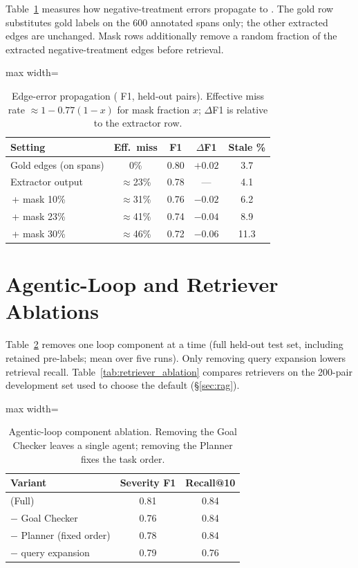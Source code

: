 Table~\ref{tab:edge_sensitivity} measures how negative-treatment errors propagate to \plre{}.
The gold row substitutes gold labels on the 600 annotated spans only; the other extracted edges are unchanged.
Mask rows additionally remove a random fraction of the extracted negative-treatment edges before retrieval.

\begin{table}[h]
\centering
\small
\setlength{\tabcolsep}{3.5pt}
\begin{adjustbox}{max width=\columnwidth}
\begin{tabular}{lcccc}
\toprule
Setting & Eff.\ miss & F1 & $\Delta$F1 & Stale \% \\
\midrule
Gold edges (on spans) & 0\% & 0.80 & $+0.02$ & 3.7 \\
Extractor output & $\approx$23\% & 0.78 & --- & 4.1 \\
\,+ mask 10\% & $\approx$31\% & 0.76 & $-0.02$ & 6.2 \\
\,+ mask 23\% & $\approx$41\% & 0.74 & $-0.04$ & 8.9 \\
\,+ mask 30\% & $\approx$46\% & 0.72 & $-0.06$ & 11.3 \\
\bottomrule
\end{tabular}
\end{adjustbox}
\caption{Edge-error propagation (\plre{} F1, held-out pairs). Effective miss rate $\approx 1 - 0.77(1 - x)$ for mask fraction $x$; $\Delta$F1 is relative to the extractor row.}
\label{tab:edge_sensitivity}
\end{table}

\section{Agentic-Loop and Retriever Ablations}
\label{app:ablations}

Table~\ref{tab:loop_ablation} removes one loop component at a time (full held-out test set, including retained pre-labels; mean over five runs).
Only removing query expansion lowers retrieval recall.
Table~\ref{tab:retriever_ablation} compares retrievers on the 200-pair development set used to choose the default (\S\ref{sec:rag}).

\begin{table}[h]
\centering
\small
\begin{adjustbox}{max width=\columnwidth}
\begin{tabular}{lcc}
\toprule
Variant & Severity F1 & Recall@10 \\
\midrule
\sysname{} (Full) & 0.81 & 0.84 \\
$-$ Goal Checker & 0.76 & 0.84 \\
$-$ Planner (fixed order) & 0.78 & 0.84 \\
$-$ query expansion & 0.79 & 0.76 \\
\bottomrule
\end{tabular}
\end{adjustbox}
\caption{Agentic-loop component ablation. Removing the Goal Checker leaves a single agent; removing the Planner fixes the task order.}
\label{tab:loop_ablation}
\end{table}

